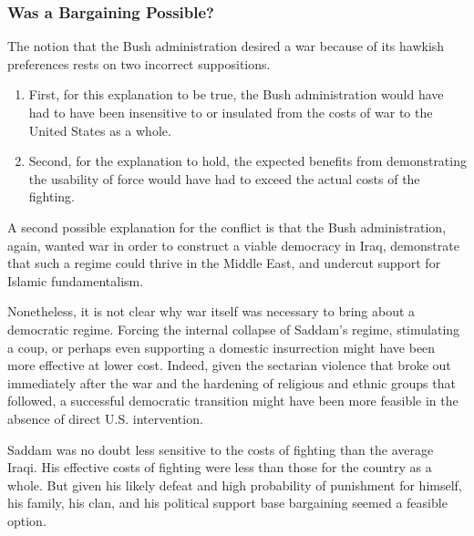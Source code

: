\subsubsection{Was a Bargaining Possible?}
The notion that the Bush administration desired a war because of its hawkish preferences rests on two incorrect suppositions.

\begin{enumerate}
    \item First, for this explanation to be true, the Bush administration would have had to have been insensitive to or insulated from the costs of war to the United States as a whole.

    \item Second, for the explanation to hold, the expected benefits from demonstrating the usability of force would have had to exceed the actual costs of the fighting.
\end{enumerate}

A second possible explanation for the conflict is that the Bush administration, again, wanted war in order to construct a viable democracy in Iraq, demonstrate that such a regime could thrive in the Middle East, and undercut support for Islamic fundamentalism.

Nonetheless, it is not clear why war itself was necessary to bring about a democratic regime. Forcing the internal collapse of Saddam's regime, stimulating a coup, or perhaps even supporting a domestic insurrection might have been more effective at lower cost. Indeed, given the sectarian violence that broke out immediately after the war and the hardening of religious and ethnic groups that followed, a successful democratic transition might have been more feasible in the absence of direct U.S. intervention.

Saddam was no doubt less sensitive to the costs of fighting than the average Iraqi. His effective costs of fighting were less than those for the country as a whole. But given his likely defeat and high probability of punishment for himself, his family, his clan, and his political support base bargaining seemed a feasible option.

